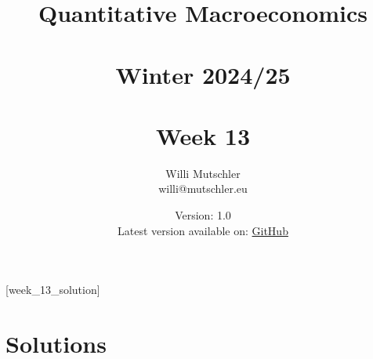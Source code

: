 
\newif\ifDisplaySolutions\DisplaySolutionstrue%


\title{Quantitative Macroeconomics\\~\\Winter 2024/25\\~\\Week 13}
\author{Willi Mutschler\\willi@mutschler.eu}
\date{Version: 1.0\\Latest version available on: \href{https://github.com/wmutschl/Quantitative-Macroeconomics/releases/latest/download/week_13.pdf}{GitHub}}
\maketitle\thispagestyle{empty}

\newpage
{}[week_13_solution]
\tableofcontents\thispagestyle{empty}\newpage

\setcounter{page}{1}
\newpage
\newpage
\newpage
\printbibliography%

\ifDisplaySolutions%
\newpage
\appendix

\section{Solutions}

\fi
